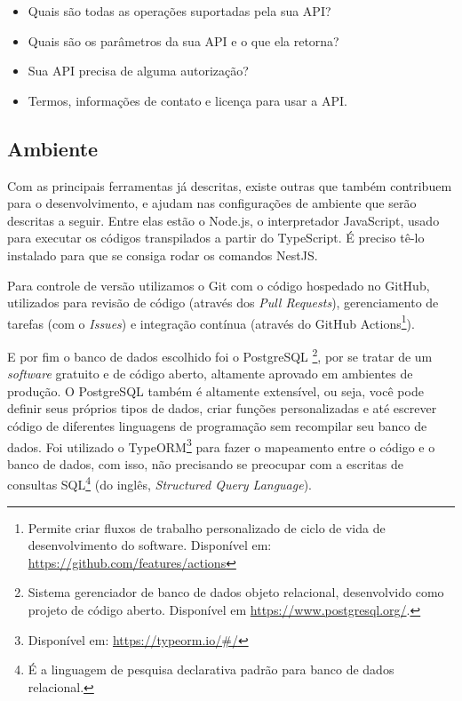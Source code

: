 \begin{itemize}
    \item Quais são todas as operações suportadas pela sua API? 
    \item Quais são os parâmetros da sua API e o que ela retorna?   
    \item Sua API precisa de alguma autorização?
    \item Termos, informações de contato e licença para usar a API.
\end{itemize}

\subsection{Ambiente}
\label{ssec:Ambiente}
Com as principais ferramentas já descritas, existe outras que também contribuem para o desenvolvimento, e ajudam nas configurações de ambiente que serão descritas a seguir. Entre elas estão o Node.js, o interpretador JavaScript, usado para executar os códigos transpilados a partir do TypeScript. É preciso tê-lo instalado para que se consiga rodar os comandos NestJS.

Para controle de versão utilizamos o Git com o código hospedado no GitHub, utilizados para revisão de código (através dos \textit{Pull Requests}), gerenciamento de tarefas (com o \textit{Issues}) e integração contínua (através do GitHub Actions\footnote{Permite criar fluxos de trabalho personalizado de ciclo de vida de desenvolvimento do software. Disponível em: \url{https://github.com/features/actions}}). 

E por fim o banco de dados escolhido foi o PostgreSQL \footnote{Sistema gerenciador de banco de dados objeto relacional, desenvolvido como projeto de código aberto. Disponível em \url{https://www.postgresql.org/}.}, por se tratar de um \textit{software} gratuito e de código aberto, altamente aprovado em ambientes de produção. O PostgreSQL também é altamente extensível, ou seja, você pode definir seus próprios tipos de dados, criar funções personalizadas e até escrever código de diferentes linguagens de programação sem recompilar seu banco de dados. Foi utilizado o TypeORM\footnote{Disponível em: \url{https://typeorm.io/#/}} para fazer o mapeamento entre o código e o banco de dados, com isso, não precisando se preocupar com a escritas de consultas SQL\footnote{É a linguagem de pesquisa declarativa padrão para banco de dados relacional.} (do inglês, \textit{Structured Query Language}).
